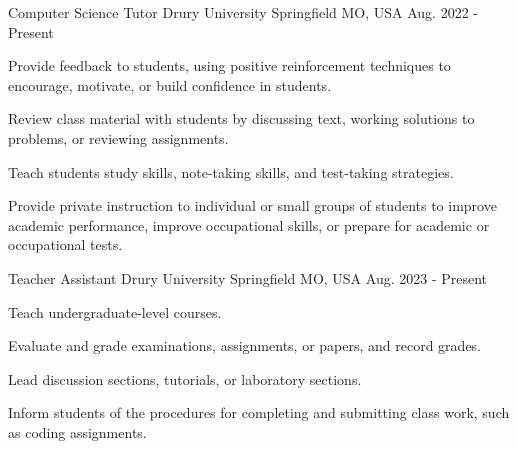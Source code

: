 
\begin{cventries}

  \cventry
    {Computer Science Tutor} %
    {Drury University} %
    {Springfield MO, USA} %
    {Aug. 2022 - Present} %
    {
        \begin{cvitems}
            \item{Provide feedback to students, using positive reinforcement techniques to encourage, motivate, or build confidence in students.}
            \item{Review class material with students by discussing text, working solutions to problems, or reviewing assignments.}
            \item{Teach students study skills, note-taking skills, and test-taking strategies.}
            \item{Provide private instruction to individual or small groups of students to improve academic performance, improve occupational skills, or prepare for academic or occupational tests.}
	\end{cvitems}
}


  \cventry
    {Teacher Assistant} %
    {Drury University} %
    {Springfield MO, USA} %
    {Aug. 2023 - Present} %
    {
      \begin{cvitems} %
        \item {Teach undergraduate-level courses.}
        \item {Evaluate and grade examinations, assignments, or papers, and record grades.}
        \item {Lead discussion sections, tutorials, or laboratory sections.}
        \item {Inform students of the procedures for completing and submitting class work, such as coding assignments.}
      \end{cvitems}
    }

\end{cventries}

